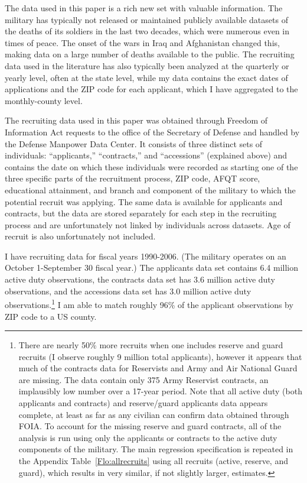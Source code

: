 \documentclass[12pt] {article}
\begin{document}
The data used in this paper is a rich new set with valuable information.
The military has typically not released or maintained publicly available
datasets of the deaths of its soldiers in the last two decades, which
were numerous even in times of peace. The onset of the wars in Iraq
and Afghanistan changed this, making data on a large number of
deaths available to the public. The recruiting data used in the literature has also typically been analyzed at the quarterly or yearly level, often at the state level, while my data contains the exact dates of applications and the ZIP code for each
applicant, which I have aggregated to the monthly-county level. 

The recruiting data used in this paper was obtained through Freedom
of Information Act requests to the office of the Secretary of Defense
and handled by the Defense Manpower Data Center. It consists of three
distinct sets of individuals: {}``applicants,'' {}``contracts,''
and {}``accessions'' (explained above) and contains the date on
which these individuals were recorded as starting one of the three
specific parts of the recruitment process, ZIP code, AFQT score, educational
attainment, and branch and component of the military to which the
potential recruit was applying. The same data is available for applicants
and contracts, but the data are stored separately for each step in
the recruiting process and are unfortunately not linked by individuals
across datasets. Age of recruit is also unfortunately not included.

I have recruiting data for fiscal years 1990-2006. (The military operates
on an October 1-September 30 fiscal year.) The applicants data set
contains 6.4 million active duty observations, the contracts data
set has 3.6 million active duty observations, and the accessions data
set has 3.0 million active duty observations.\footnote{There are nearly 50\%
more recruits when one includes reserve and guard recruits (I
observe roughly 9 million total applicants), however it appears that
much of the contracts data for Reservists and Army and Air National
Guard are missing. The data contain only 375 Army Reservist contracts,
an implausibly low number over a 17-year period. Note that all active duty (both applicants and contracts) and reserve/guard applicants data appears complete, at least as far as any civilian can confirm data obtained through FOIA. To account for the missing reserve and guard contracts, all of the analysis is run using only the applicants or contracts to the active duty components of the military. The main regression specification is repeated in the Appendix Table~\ref{Flo:allrecruits} using all recruits (active, reserve, and guard), which results in very similar, if not slightly larger, estimates.} I am able to match roughly 96\% of the applicant observations by ZIP code to a US county.
\end{document}
